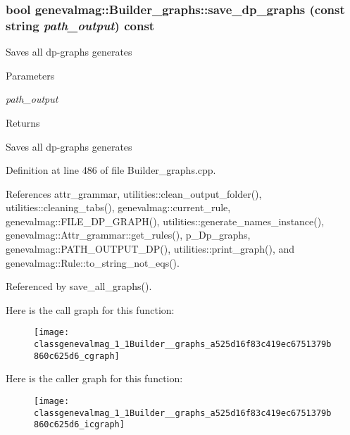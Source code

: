 \hypertarget{classgenevalmag_1_1Builder__graphs_a525d16f83c419ec6751379b860c625d6}{
\subsubsection[{save\_\-dp\_\-graphs}]{\setlength{\rightskip}{0pt plus 5cm}bool genevalmag::Builder\_\-graphs::save\_\-dp\_\-graphs (const string {\em path\_\-output}) const}}
\label{classgenevalmag_1_1Builder__graphs_a525d16f83c419ec6751379b860c625d6}
Saves all dp-\/graphs generates 
\begin{DoxyParams}{Parameters}
\item[{\em path\_\-output}]\end{DoxyParams}
\begin{DoxyReturn}{Returns}

\end{DoxyReturn}
Saves all dp-\/graphs generates 

Definition at line 486 of file Builder\_\-graphs.cpp.



References attr\_\-grammar, utilities::clean\_\-output\_\-folder(), utilities::cleaning\_\-tabs(), genevalmag::current\_\-rule, genevalmag::FILE\_\-DP\_\-GRAPH(), utilities::generate\_\-names\_\-instance(), genevalmag::Attr\_\-grammar::get\_\-rules(), p\_\-Dp\_\-graphs, genevalmag::PATH\_\-OUTPUT\_\-DP(), utilities::print\_\-graph(), and genevalmag::Rule::to\_\-string\_\-not\_\-eqs().



Referenced by save\_\-all\_\-graphs().



Here is the call graph for this function:\nopagebreak
\begin{figure}[H]
\begin{center}
\leavevmode
\texttt{[image: classgenevalmag\_1\_1Builder\_\_graphs\_a525d16f83c419ec6751379b860c625d6\_cgraph]}
\end{center}
\end{figure}




Here is the caller graph for this function:\nopagebreak
\begin{figure}[H]
\begin{center}
\leavevmode
\texttt{[image: classgenevalmag\_1\_1Builder\_\_graphs\_a525d16f83c419ec6751379b860c625d6\_icgraph]}
\end{center}
\end{figure}




